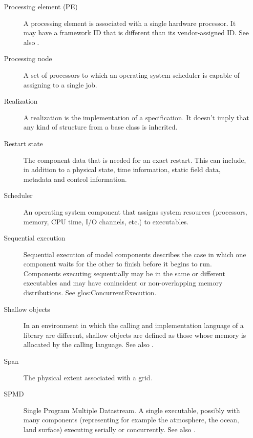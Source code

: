 \begin{description}
\item[Processing element (PE)] \label{glos:Processing_Element}
  A processing element is associated with a single hardware processor.  It may
  have a framework ID that is different than its vendor-assigned ID.
  See also .  

\item[Processing node] \label{glos:Pnode} A set of processors to which an
  operating system scheduler is capable of assigning to a single job.

\item[Realization] \label{glos:Realization} A realization is the 
  implementation of a specification.  It doesn't imply that any kind
  of structure from a base class is inherited.

\item[Restart state] \label{glos:RestartState} The component 
  data that is needed for an exact restart. This can include, 
  in addition to a physical state, time information, static field data,
  metadata and control information. 

\item[Scheduler] \label{glos:Scheduler} An operating system component 
  that assigns system resources (processors, memory, CPU time, 
  I/O channels, etc.) to executables.

\item[Sequential execution] \label{glos:SequentialExecution}
  Sequential execution of model components describes the case in which 
  one component waits for the other to finish before it begins
  to run.  Components executing sequentially may be in the same or 
  different executables and may have conincident or non-overlapping 
  memory distributions.  See 
  {glos:ConcurrentExecution}.

\item[Shallow objects] \label{glos:ShallowObjects} In an environment
  in which the calling and implementation language of a library are
  different, shallow objects are defined as those whose memory is 
  allocated by the calling language. 
  See also .

\item[Span] \label{glos:Span} The physical extent associated with a grid.

\item[SPMD] \label{glos:SPMD} Single Program Multiple Datastream. 
  A single executable, possibly with many components (representing 
  for example the atmosphere, the ocean, land surface) executing 
  serially or concurrently. See also . 


\end{description}
